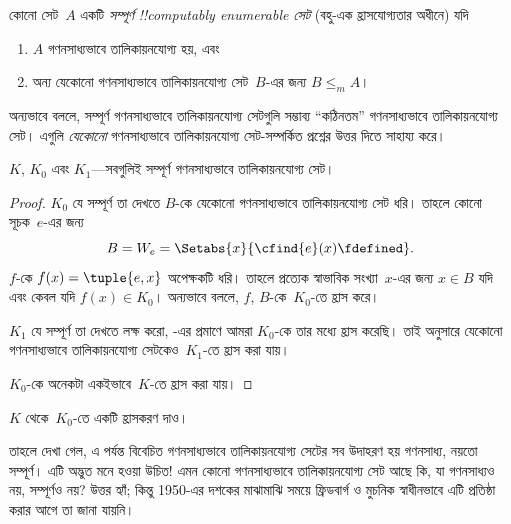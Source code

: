 \documentclass[../../../include/open-logic-section]{subfiles}
\begin{document}

\begin{defn}
কোনো সেট~$A$ একটি \emph{সম্পূর্ণ !!{computably enumerable} সেট}
(বহু-এক হ্রাসযোগ্যতার অধীনে) যদি
\begin{enumerate}
\item $A$ গণনসাধ্যভাবে তালিকায়নযোগ্য হয়, এবং
\item অন্য যেকোনো গণনসাধ্যভাবে তালিকায়নযোগ্য সেট~$B$-এর জন্য
$B \leq_m A$।
\end{enumerate}
\end{defn}

অন্যভাবে বললে, সম্পূর্ণ গণনসাধ্যভাবে তালিকায়নযোগ্য সেটগুলি সম্ভাব্য
“কঠিনতম” গণনসাধ্যভাবে তালিকায়নযোগ্য সেট। এগুলি \emph{যেকোনো}
গণনসাধ্যভাবে তালিকায়নযোগ্য সেট-সম্পর্কিত প্রশ্নের উত্তর দিতে সাহায্য করে।

\begin{thm}
$K$, $K_0$ এবং $K_1$—সবগুলিই সম্পূর্ণ গণনসাধ্যভাবে তালিকায়নযোগ্য সেট।
\end{thm}

\begin{proof}
$K_0$ যে সম্পূর্ণ তা দেখতে $B$-কে যেকোনো গণনসাধ্যভাবে তালিকায়নযোগ্য
সেট ধরি। তাহলে কোনো সূচক~$e$-এর জন্য
\[
B = W_e = \Setabs{x}{\cfind{e}(x) \fdefined}.
\]
$f$-কে $f(x) = \tuple{e, x}$ অপেক্ষকটি ধরি। তাহলে প্রত্যেক স্বাভাবিক
সংখ্যা~$x$-এর জন্য $x \in B$ যদি এবং কেবল যদি $f(x) \in K_0$। অন্যভাবে
বললে, $f$, $B$-কে~$K_0$-তে হ্রাস করে।

$K_1$ যে সম্পূর্ণ তা দেখতে লক্ষ করো, -এর প্রমাণে
আমরা $K_0$-কে তার মধ্যে হ্রাস করেছি। তাই 
অনুসারে যেকোনো গণনসাধ্যভাবে তালিকায়নযোগ্য সেটকেও~$K_1$-তে হ্রাস করা যায়।

$K_0$-কে অনেকটা একইভাবে~$K$-তে হ্রাস করা যায়।
\end{proof}

\begin{prob}
$K$ থেকে~$K_0$-তে একটি হ্রাসকরণ দাও।
\end{prob}

\begin{digress}
তাহলে দেখা গেল, এ পর্যন্ত বিবেচিত গণনসাধ্যভাবে তালিকায়নযোগ্য সেটের
সব উদাহরণ হয় গণনসাধ্য, নয়তো সম্পূর্ণ। এটি অদ্ভুত মনে হওয়া উচিত!{}
এমন কোনো গণনসাধ্যভাবে তালিকায়নযোগ্য সেট আছে কি, যা গণনসাধ্যও নয়,
সম্পূর্ণও নয়? উত্তর হ্যাঁ; কিন্তু 1950-এর দশকের মাঝামাঝি সময়ে
ফ্রিডবার্গ ও মুচনিক স্বাধীনভাবে এটি প্রতিষ্ঠা করার আগে তা জানা যায়নি।
\end{digress}
\end{document}
